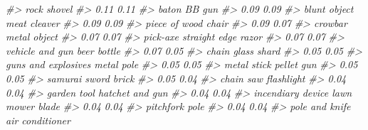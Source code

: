 \documentclass[
  12pt,
]{book}
\newenvironment{Shaded}{\begin{snugshade}}{\end{snugshade}}
\newcommand{\CommentTok}[1]{\textcolor[rgb]{0.37,0.37,0.37}{\textit{#1}}}
\begin{document}
\begin{Shaded}
\begin{Highlighting}[]
\CommentTok{\#>                             rock                           shovel }
\CommentTok{\#>                             0.11                             0.11 }
\CommentTok{\#>                            baton                           BB gun }
\CommentTok{\#>                             0.09                             0.09 }
\CommentTok{\#>                     blunt object                     meat cleaver }
\CommentTok{\#>                             0.09                             0.09 }
\CommentTok{\#>                    piece of wood                            chair }
\CommentTok{\#>                             0.09                             0.07 }
\CommentTok{\#>                          crowbar                     metal object }
\CommentTok{\#>                             0.07                             0.07 }
\CommentTok{\#>                         pick{-}axe              straight edge razor }
\CommentTok{\#>                             0.07                             0.07 }
\CommentTok{\#>                  vehicle and gun                      beer bottle }
\CommentTok{\#>                             0.07                             0.05 }
\CommentTok{\#>                            chain                      glass shard }
\CommentTok{\#>                             0.05                             0.05 }
\CommentTok{\#>              guns and explosives                       metal pole }
\CommentTok{\#>                             0.05                             0.05 }
\CommentTok{\#>                      metal stick                       pellet gun }
\CommentTok{\#>                             0.05                             0.05 }
\CommentTok{\#>                    samurai sword                            brick }
\CommentTok{\#>                             0.05                             0.04 }
\CommentTok{\#>                        chain saw                       flashlight }
\CommentTok{\#>                             0.04                             0.04 }
\CommentTok{\#>                      garden tool                  hatchet and gun }
\CommentTok{\#>                             0.04                             0.04 }
\CommentTok{\#>                incendiary device                 lawn mower blade }
\CommentTok{\#>                             0.04                             0.04 }
\CommentTok{\#>                        pitchfork                             pole }
\CommentTok{\#>                             0.04                             0.04 }
\CommentTok{\#>                   pole and knife                  air conditioner }

\end{Highlighting}
\end{Shaded}
\end{document}
